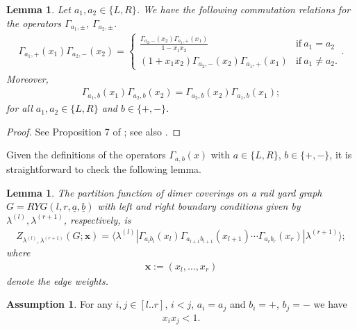 \documentclass[11pt]{amsart}
\theoremstyle{plain}
\newtheorem{lemma}[theorem]{Lemma}
\theoremstyle{definition}
\newtheorem{assumption}[theorem]{Assumption}
\theoremstyle{remark}
\numberwithin{equation}{section}
\numberwithin{theorem}{section}
\numberwithin{figure}{section}
\begin{document}
\begin{lemma}\label{l12}Let $a_1,a_2\in \{L,R\}$. We have the following commutation relations for the operators $\Gamma_{a_1,\pm}$, $\Gamma_{a_2,\pm}$.
\begin{eqnarray*}
\Gamma_{a_1,+}(x_1)\Gamma_{a_2,-}(x_2)=\begin{cases}\frac{\Gamma_{a_2,-}(x_2)\Gamma_{a_1,+}(x_1)}{1-x_1x_2}&\mathrm{if}\ a_1=a_2\\(1+x_1x_2)\Gamma_{a_2,-}(x_2)\Gamma_{a_1,+}(x_1)&\mathrm{if}\ a_1\neq a_2.\end{cases}.
\end{eqnarray*}
Moreover,
\begin{eqnarray*}
\Gamma_{a_1,b}(x_1)\Gamma_{a_2,b}(x_2)=\Gamma_{a_2,b}(x_2)\Gamma_{a_1,b}(x_1);
\end{eqnarray*}
for all $a_1,a_2\in\{L,R\}$ and $b\in\{+,-\}$.
\end{lemma}

\begin{proof}See Proposition 7 of \cite{bbccr}; see also \cite{you10,bbb14}.
\end{proof}

Given the definitions of the operators $\Gamma_{a,b}(x)$ with $a\in\{L,R\}$, $b\in\{+,-\}$, it is straightforward to check the following lemma.

\begin{lemma}\label{l13}The partition function of dimer coverings on a rail yard graph $G=RYG(l,r,\underline{a},\underline{b})$ with left and right boundary conditions given by $\lambda^{(l)},\lambda^{(r+1)}$, respectively,  is 
\begin{eqnarray}
Z_{\lambda^{(l)},\lambda^{(r+1)}}(G;\mathbf{x})=\langle\lambda^{(l)}| \Gamma_{a_lb_l}(x_l)\Gamma_{a_{l+1}b_{l+1}}(x_{l+1})\cdots \Gamma_{a_rb_r}(x_r)|\lambda^{(r+1)} \rangle;\label{bf}
\end{eqnarray}
where
\begin{align}
\mathbf{x}:=(x_{l},\ldots,x_{r})
\end{align}
denote the edge weights.
\end{lemma}

\begin{assumption}\label{ap14}For any $i,j\in[l..r]$, $i<j$, $a_i=a_j$ and $b_i=+$, $b_j=-$ we have
\begin{eqnarray*}
x_ix_j<1.
\end{eqnarray*}
\end{assumption}
\end{document}

